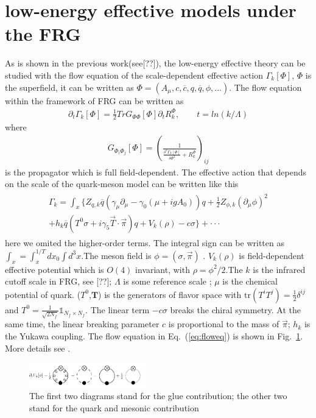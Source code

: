 \documentclass[%
reprint,
superscriptaddress,
showpacs,preprintnumbers,
 amsmath,amssymb,
 aps,
prd,
]{revtex4-1}
\def\Fig#1{Fig.~\ref{#1}} \def\Tab#1{Tab.~\ref{#1}}
\def\Eq#1{Eq.~(\ref{#1})}
\begin{document}
\section{low-energy effective models under the FRG}
As is shown in the previous work(see[??]), the low-energy effective theory can be studied with the flow equation of the 
scale-dependent effective action $
\Gamma_k[\Phi]$, $\Phi$ is the superfield, it can be written as
 $\Phi=(A_\mu,c,\overline{c},q,\overline{q},\phi,...)$.  The flow equation within the framework of FRG can be written as
\begin{align}
\partial_t\Gamma_k[\Phi]=\frac{1}{2}TrG_{\Phi\Phi}[\Phi]\partial_tR_k^\Phi,\qquad t=ln(k/\Lambda)
\label{eq:floweq}
\end{align}
where
\begin{align}
G_{\Phi_i\Phi_j}[\Phi]=\left(\frac{1}{\frac{\delta^2\Gamma_k[\Phi]}{\delta\Phi^2}+R^\Phi_k}\right)_{ij}
\end{align}
is the propagator which is full field-dependent.
The effective action that depends on the scale of the quark-meson model can be written like this
\begin{align}
\begin{split}
\Gamma_k=\int_x\{Z_{q,k}\overline{q} (\gamma_\mu \partial_\mu -\gamma_0(\mu+igA_0) )q+\frac{1}{2}Z_{\phi,k}
(\partial_\mu \phi)^2\\+h_k\overline{q}
(T^0\sigma+i\gamma_5\vec{T}\cdot\vec{\pi})q+V_k(\rho)-c\sigma \}+\cdot\cdot\cdot\label{eq:effact}
\end{split}
\end{align}
here we omited the higher-order terms. The integral sign can be written as $\int_x=\int_x^{1/T}dx_0\int d^3x$.The meson 
field is $\phi=\left(\sigma,\vec{\pi}
\right)$ . 
$V_k(\rho)$ is field-dependent effective potential which is $O(4)$ invariant, with $\rho=\phi^2/2$.The $k$ is the infrared 
cutoff scale in FRG, see [??]; $
\Lambda$ 
is some reference scale ; $\mu$ is the chemical potential of quark. ($T^0$,$\bm{T}$) is the generators of flavor space with  
$\mathrm{tr}(T^{i}T^{j})=\frac{1}
{2}\delta^{ij}$ and
 $T^{0}=\frac{1}{\sqrt{2N_{f}}}\mathbb{1}_{N_{f}\times N_{f}}$. The linear term $-c\sigma$ breaks the chiral symmetry. At 
 the same time, the linear breaking 
 parameter $c$ is proportional to the mass of $\vec{\pi}$; $h_k$ is the Yukawa coupling. The flow equation in \Eq{eq:floweq} is shown in \Fig{fig:fe}. More details see \cite{?}.\\
\begin{figure}[h]
\includegraphics[width=0.45\textwidth]{FRG-QCD_rebosonised.pdf}
\caption{The first two diagrams stand for the glue contribution; the other two stand for the quark and mesonic contribution }
\label{fig:fe}
\end{figure}
\end{document}

